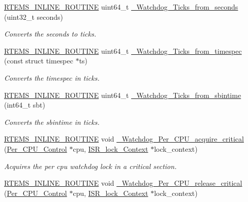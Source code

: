 \begin{DoxyCompactItemize}
\mbox{\hyperlink{group__RTEMSScoreBaseDefs_gac216239df231d5dbd15e3520b0b9313f}{R\+T\+E\+M\+S\+\_\+\+I\+N\+L\+I\+N\+E\+\_\+\+R\+O\+U\+T\+I\+NE}} uint64\+\_\+t \mbox{\hyperlink{group__RTEMSScoreWatchdog_gae368bd39a2a612b0e7701d954d363ce6}{\+\_\+\+Watchdog\+\_\+\+Ticks\+\_\+from\+\_\+seconds}} (uint32\+\_\+t seconds)
\begin{DoxyCompactList}\small\item\em Converts the seconds to ticks. \end{DoxyCompactList}\item 
\mbox{\hyperlink{group__RTEMSScoreBaseDefs_gac216239df231d5dbd15e3520b0b9313f}{R\+T\+E\+M\+S\+\_\+\+I\+N\+L\+I\+N\+E\+\_\+\+R\+O\+U\+T\+I\+NE}} uint64\+\_\+t \mbox{\hyperlink{group__RTEMSScoreWatchdog_ga04e1294fd46a613921a5323b3dc0b090}{\+\_\+\+Watchdog\+\_\+\+Ticks\+\_\+from\+\_\+timespec}} (const struct timespec $\ast$ts)
\begin{DoxyCompactList}\small\item\em Converts the timespec in ticks. \end{DoxyCompactList}\item 
\mbox{\hyperlink{group__RTEMSScoreBaseDefs_gac216239df231d5dbd15e3520b0b9313f}{R\+T\+E\+M\+S\+\_\+\+I\+N\+L\+I\+N\+E\+\_\+\+R\+O\+U\+T\+I\+NE}} uint64\+\_\+t \mbox{\hyperlink{group__RTEMSScoreWatchdog_ga6abc5a68b56a5234229974cc9d6a33e6}{\+\_\+\+Watchdog\+\_\+\+Ticks\+\_\+from\+\_\+sbintime}} (int64\+\_\+t sbt)
\begin{DoxyCompactList}\small\item\em Converts the sbintime in ticks. \end{DoxyCompactList}\item 
\mbox{\hyperlink{group__RTEMSScoreBaseDefs_gac216239df231d5dbd15e3520b0b9313f}{R\+T\+E\+M\+S\+\_\+\+I\+N\+L\+I\+N\+E\+\_\+\+R\+O\+U\+T\+I\+NE}} void \mbox{\hyperlink{group__RTEMSScoreWatchdog_ga2d69aa4531d31a6d4c7784de2e4e91ae}{\+\_\+\+Watchdog\+\_\+\+Per\+\_\+\+C\+P\+U\+\_\+acquire\+\_\+critical}} (\mbox{\hyperlink{structPer__CPU__Control}{Per\+\_\+\+C\+P\+U\+\_\+\+Control}} $\ast$cpu, \mbox{\hyperlink{structISR__lock__Context}{I\+S\+R\+\_\+lock\+\_\+\+Context}} $\ast$lock\+\_\+context)
\begin{DoxyCompactList}\small\item\em Acquires the per cpu watchdog lock in a critical section. \end{DoxyCompactList}\item 
\mbox{\hyperlink{group__RTEMSScoreBaseDefs_gac216239df231d5dbd15e3520b0b9313f}{R\+T\+E\+M\+S\+\_\+\+I\+N\+L\+I\+N\+E\+\_\+\+R\+O\+U\+T\+I\+NE}} void \mbox{\hyperlink{group__RTEMSScoreWatchdog_ga6b10befdd7d24a03d5b738b62c08a4f3}{\+\_\+\+Watchdog\+\_\+\+Per\+\_\+\+C\+P\+U\+\_\+release\+\_\+critical}} (\mbox{\hyperlink{structPer__CPU__Control}{Per\+\_\+\+C\+P\+U\+\_\+\+Control}} $\ast$cpu, \mbox{\hyperlink{structISR__lock__Context}{I\+S\+R\+\_\+lock\+\_\+\+Context}} $\ast$lock\+\_\+context)

\end{DoxyCompactItemize}
